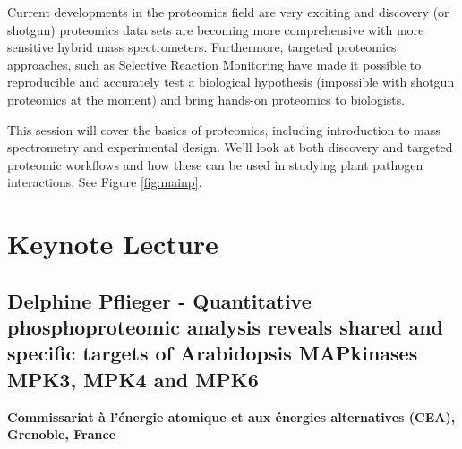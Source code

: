 \documentclass[12pt,]{book}
\theoremstyle{definition}
\theoremstyle{definition}
\theoremstyle{remark}
\begin{document}
Current developments in the proteomics field are very exciting and
discovery (or shotgun) proteomics data sets are becoming more
comprehensive with more sensitive hybrid mass spectrometers.
Furthermore, targeted proteomics approaches, such as Selective Reaction
Monitoring \citep{Picotti:2013jp} have made it possible to reproducible
and accurately test a biological hypothesis (impossible with shotgun
proteomics at the moment) and bring hands-on proteomics to biologists.

This session will cover the basics of proteomics, including introduction
to mass spectrometry and experimental design. We'll look at both
discovery and targeted proteomic workflows and how these can be used in
studying plant pathogen interactions. See Figure \ref{fig:mainp}.

\section*{Keynote Lecture}\label{keynote-lecture-6}

\subsection*{Delphine Pflieger - Quantitative phosphoproteomic analysis
reveals shared and specific targets of Arabidopsis MAPkinases MPK3, MPK4
and
MPK6}\label{delphine-pflieger---quantitative-phosphoproteomic-analysis-reveals-shared-and-specific-targets-of-arabidopsis-mapkinases-mpk3-mpk4-and-mpk6}

\textbf{Commissariat à l'énergie atomique et aux énergies alternatives
(CEA), Grenoble, France}
\end{document}
